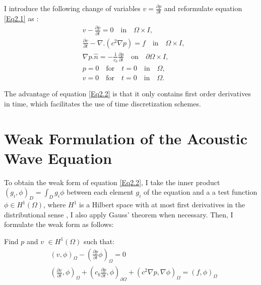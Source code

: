  I introduce the following change of variables $ v=\frac{\partial p}{\partial t}$ and  reformulate equation  \ref{Eq2.1}  as :
 \begin{equation} \label{Eq2.2}
 \begin{split}
  &v -\frac{\partial p}{\partial t} =0 \quad  \textrm{in} \quad \Omega \times I, \\
  &\frac{\partial v}{\partial t} - \nabla . \left(  c^2 \nabla p  \right)  = f   \quad  \textrm{in} \quad \Omega \times I, \\
  &\nabla p . \hat{n} = - \frac{1}{c_b}  \frac{\partial p}{\partial t} \quad  \textrm{on} \quad \partial \Omega \times I,\\
  &p = 0  \quad \textrm{for} \quad t=0  \quad \textrm{in}  \quad \Omega, \\
  & v= 0 \quad \textrm{for} \quad t=0  \quad \textrm{in} \quad \Omega.
  \end{split}
 \end{equation}
 
 The advantage of equation \ref{Eq2.2} is that it  only contains first order derivatives in time, which facilitates the use of  time  discretization schemes. 
 
\section{Weak Formulation of the Acoustic Wave Equation}
To obtain the weak form of equation \ref{Eq2.2}, I  take the inner product $(g_i,\phi)_D = \int_D g_i \phi$ between each element $g_i$ of the equation and a a test function $\phi \in  H^1(\Omega)$,  where  $H^1$ is a Hilbert space with at most  first derivatives in the distributional sense \cite{Brenner2008}, I also apply Gauss' theorem when necessary. Then, I formulate the weak form as follows:

Find $p$ and $v$  $\in  H^1(\Omega)$ such that:
 \begin{equation} \label{Eq2.3}
 \begin{split}
   & \left( v, \phi \right)_\Omega - \left( \frac{\partial p}{\partial t}  \phi \right)_\Omega  =0 \\
   & \left( \frac{\partial v}{\partial t}, \phi \right)_\Omega  + \left(  c_b \frac{\partial p}{\partial t} , \phi  \right)_{\partial \Omega} +
   \left(  c^2 \nabla p, \nabla \phi  \right)_\Omega = \left( f, \phi \right)_\Omega  
 \end{split}
 \end{equation}

